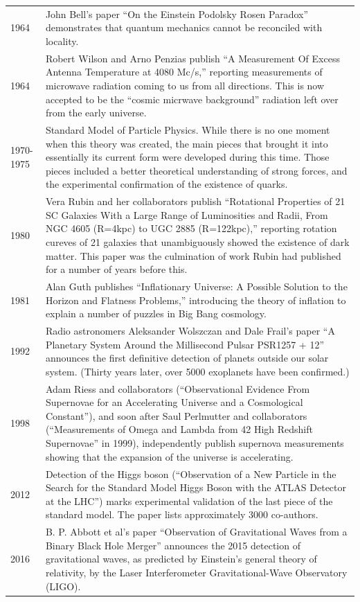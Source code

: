 \documentclass[../../../main.tex]{subfiles}
\begin{document}
\begin{center}
\begin{longtable}{p{}  p{}}
1964&John Bell's paper “On the Einstein Podolsky Rosen Paradox” demonstrates that quantum mechanics cannot be reconciled with locality.\\
1964&Robert Wilson and Arno Penzias publish “A Measurement Of Excess Antenna Temperature at 4080 Mc/s,” reporting measurements of microwave radiation coming to us from all directions. This is now accepted to be the “cosmic micrwave background” radiation left over from the early universe.\\
1970-1975&Standard Model of Particle Physics. While there is no one moment when this theory was created, the main pieces that brought it into essentially its current form were developed during this time. Those pieces included a better theoretical understanding of strong forces, and the experimental confirmation of the existence of quarks.\\
1980&Vera Rubin and her collaborators publish “Rotational Properties of 21 SC Galaxies With a Large Range of Luminosities and Radii, From NGC
4605 (R=4kpc) to UGC 2885 (R=122kpc),” reporting rotation cureves of 21 galaxies that unambiguously showed the existence of dark matter. This paper was the culmination of work Rubin had published for a number of years before this.\\
1981&Alan Guth publishes “Inflationary Universe: A Possible Solution to the Horizon and Flatness Problems,” introducing the theory of inflation to explain a number of puzzles in Big Bang cosmology.\\
1992&Radio astronomers Aleksander Wolszczan and Dale Frail's paper “A Planetary System Around the Millisecond Pulsar PSR1257 + 12” announces the first definitive detection of planets outside our solar system. (Thirty years later, over 5000 exoplanets have been confirmed.) \\
1998&Adam Riess and collaborators (“Observational Evidence From Supernovae for an Accelerating Universe and a Cosmological Constant”), and soon after Saul Perlmutter and collaborators (“Measurements of Omega
and Lambda from 42 High Redshift Supernovae” in 1999), independently publish supernova measurements showing that the expansion of the universe is accelerating.\\
2012&Detection of the Higgs boson (“Observation of a New Particle in the Search for the Standard Model Higgs Boson with the ATLAS Detector at the LHC”) marks experimental validation of the last piece of the standard model. The paper lists approximately 3000 co-authors.\\
2016&B. P. Abbott et al's paper “Observation of Gravitational Waves from a Binary Black Hole Merger” announces the 2015  detection of gravitational waves, as predicted by Einstein's general theory of relativity, by the Laser Interferometer Gravitational-Wave Observatory (LIGO).\\

\end{longtable}
\end{center}
\end{document}
